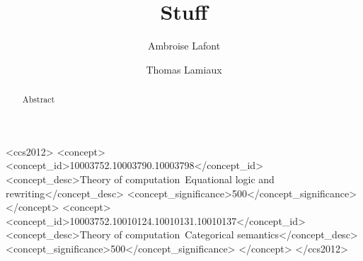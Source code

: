 \documentclass[acmsmall,anonymous,screen,review]{acmart}
\theoremstyle{acmdefinition}
\begin{document}
\title{Stuff}

\author{Ambroise Lafont}
\author{Thomas Lamiaux}




\begin{abstract}
  Abstract
\end{abstract}

\begin{CCSXML}
  <ccs2012>
  <concept>
  <concept_id>10003752.10003790.10003798</concept_id>
  <concept_desc>Theory of computation~Equational logic and rewriting</concept_desc>
  <concept_significance>500</concept_significance>
  </concept>
  <concept>
  <concept_id>10003752.10010124.10010131.10010137</concept_id>
  <concept_desc>Theory of computation~Categorical semantics</concept_desc>
  <concept_significance>500</concept_significance>
  </concept>
  </ccs2012>
\end{CCSXML}
  
  
\end{document}
